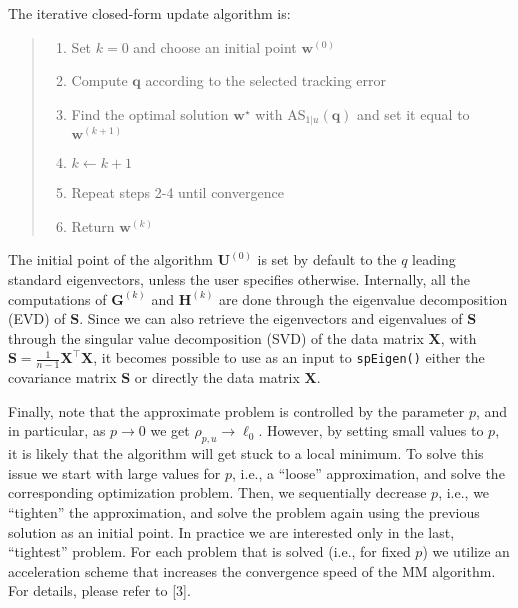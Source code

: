 \documentclass[]{article}
\providecommand{\tightlist}{%
  \setlength{\itemsep}{0pt}\setlength{\parskip}{0pt}}
\begin{document}
The iterative closed-form update algorithm is:

\begin{quote}
\begin{enumerate}
\def\labelenumi{\arabic{enumi}.}
\tightlist
\item
  Set \(k=0\) and choose an initial point \(\mathbf{w}^{(0)}\)\\
\item
  Compute \(\mathbf{q}\) according to the selected tracking error\\
\item
  Find the optimal solution \(\mathbf{w}^\star\) with
  AS\(_{1|u}(\mathbf{q})\) and set it equal to \(\mathbf{w}^{(k+1)}\)
\item
  \(k \gets k+1\)\\
\item
  Repeat steps 2-4 until convergence\\
\item
  Return \(\mathbf{w}^{(k)}\)
\end{enumerate}
\end{quote}

The initial point of the algorithm \(\mathbf{U}^{(0)}\) is set by
default to the \(q\) leading standard eigenvectors, unless the user
specifies otherwise. Internally, all the computations of
\(\mathbf{G}^{(k)}\) and \(\mathbf{H}^{(k)}\) are done through the
eigenvalue decomposition (EVD) of \(\mathbf{S}\). Since we can also
retrieve the eigenvectors and eigenvalues of \(\mathbf{S}\) through the
singular value decomposition (SVD) of the data matrix \(\mathbf{X}\),
with \(\mathbf{S} = \frac{1}{n-1}\mathbf{X}^\top\mathbf{X}\), it becomes
possible to use as an input to \texttt{spEigen()} either the covariance
matrix \(\mathbf{S}\) or directly the data matrix \(\mathbf{X}\).

Finally, note that the approximate problem is controlled by the
parameter \(p\), and in particular, as \(p\rightarrow0\) we get
\(\rho_{p,u}\rightarrow\ell_0\). However, by setting small values to
\(p\), it is likely that the algorithm will get stuck to a local
minimum. To solve this issue we start with large values for \(p\), i.e.,
a ``loose'' approximation, and solve the corresponding optimization
problem. Then, we sequentially decrease \(p\), i.e., we ``tighten'' the
approximation, and solve the problem again using the previous solution
as an initial point. In practice we are interested only in the last,
``tightest'' problem. For each problem that is solved (i.e., for fixed
\(p\)) we utilize an acceleration scheme that increases the convergence
speed of the MM algorithm. For details, please refer to {[}3{]}.
\end{document}
